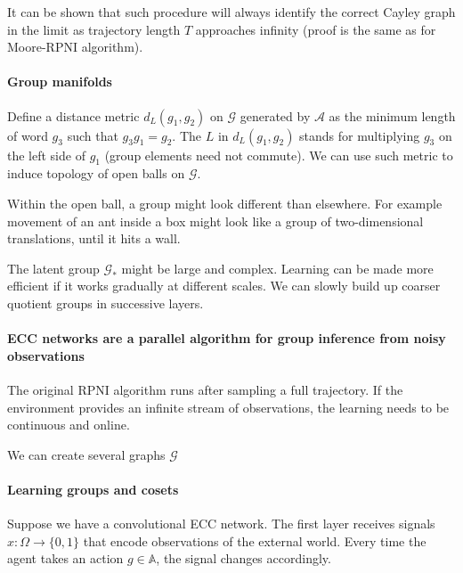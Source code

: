 \documentclass[12pt]{article}
\begin{document}
It can be shown that such procedure will always identify the correct Cayley graph in the limit as trajectory length $T$ approaches infinity (proof is the same as for Moore-RPNI algorithm).





\paragraph{Group manifolds}


Define a distance metric $d_L(g_1,g_2)$ on $\mathcal{G}$ generated by $\mathcal{A}$ as the minimum length of word $g_3$ such that $g_3g_1=g_2$. The $L$ in $d_L(g_1,g_2)$ stands for multiplying $g_3$ on the left side of $g_1$ (group elements  need not commute). 
We can use such metric to induce topology of open balls on $\mathcal{G}$.

Within the open ball, a group might look different than elsewhere. For example movement of an ant inside a box might look like a group of two-dimensional translations, until it hits a wall. 



The latent group $\mathcal{G}_{*}$ might be large and complex. Learning can be made more efficient if it works gradually at different scales. We can slowly build up coarser quotient groups in successive layers.

\paragraph{ECC networks are a parallel algorithm for group inference from noisy observations}
The original RPNI algorithm runs after sampling a full trajectory. If the environment provides an infinite stream of observations, the learning needs to be continuous and online.  

We can create several graphs $\mathcal{G}$ 


\paragraph{Learning groups and cosets}

Suppose we have a convolutional ECC network. The first layer receives signals $x:\Omega \rightarrow \{0,1\}$ that encode observations of the external world. Every time the agent takes an action $g\in\mathbb{A}$, the signal changes accordingly. 
\end{document}
